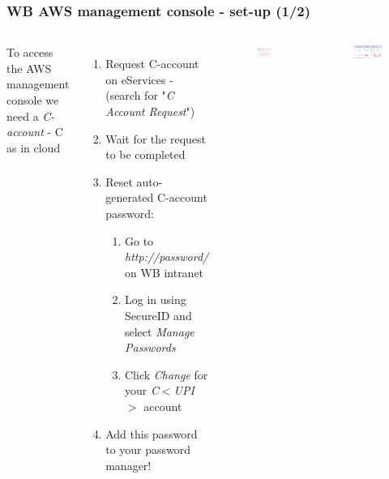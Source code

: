 \documentclass[aspectratio=169]{beamer} %
\begin{document}
\begin{frame}
	\frametitle{WB AWS management console - set-up (1/2)}
	\begin{columns}[c]


		To access the AWS management console we need a \textit{C-account} - C as in cloud

		\begin{enumerate}
			\item Request C-account on eServices 
			- (search for "\textit{C Account Request}")
			\item Wait for the request to be completed
			\item Reset auto-generated C-account password:
			\begin{enumerate}
				\item Go to \textit{http://password/} on WB intranet
				\item Log in using SecureID and select \textit{Manage Passwords}
				\item Click \textit{Change} for your \textit{C$<$UPI$>$} account
			\end{enumerate}
			\item Add this password to your password manager!
		\end{enumerate}

		\begin{figure}
			\centering
			\includegraphics[width=.5\textwidth]{./img/password-1.png}
		\end{figure}
		\vspace{.2cm}
		\begin{figure}
			\centering
			\includegraphics[width=1\textwidth]{./img/password-2.png}
		\end{figure}

	\end{columns}
\end{frame}
\end{document}
